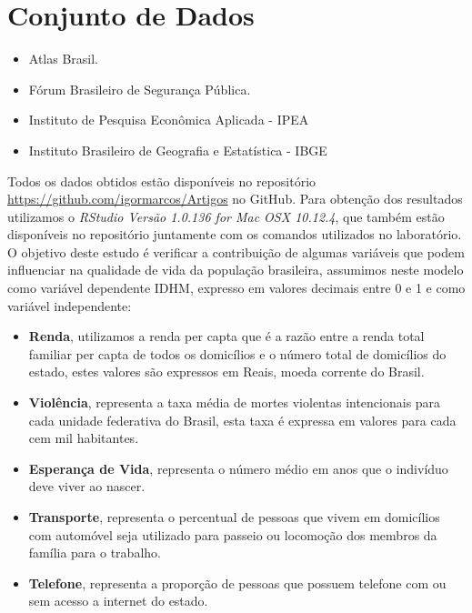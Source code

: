 \documentclass[10pt,foldmark,notumble]{leaflet}
\begin{document}
\pagebreak

\section{Conjunto de Dados}

\begin{itemize}
			\item Atlas Brasil.
            \item Fórum Brasileiro de Segurança Pública.
            \item Instituto de Pesquisa Econômica Aplicada - IPEA
            \item Instituto Brasileiro de Geografia e Estatística - IBGE
		\end{itemize} 
        

Todos os dados obtidos estão disponíveis no repositório \url{https://github.com/igormarcos/Artigos} no GitHub. Para obtenção dos resultados utilizamos o \emph{RStudio Versão 1.0.136 for Mac OSX 10.12.4}, que também estão disponíveis no repositório\cite{RepoIgor2017} juntamente com os comandos utilizados no laboratório. O objetivo deste estudo é verificar a contribuição de algumas variáveis que podem influenciar na qualidade de vida da população brasileira, assumimos neste modelo como variável dependente IDHM, expresso em valores decimais entre 0 e 1 e como variável independente:

\begin{itemize}
\item {\textbf{Renda}, utilizamos a renda per capta que é a razão entre a renda total familiar per capta de todos os domicílios e o número total de domicílios do estado, estes valores são expressos em Reais, moeda corrente do Brasil.}
\item {\textbf{Violência}, representa a taxa média de mortes violentas intencionais para cada unidade federativa do Brasil, esta taxa é expressa em valores para cada cem mil habitantes.}
\item {\textbf{Esperança de Vida}, representa o número médio em anos que o indivíduo deve viver ao nascer.}
\item {\textbf{Transporte}, representa o percentual de pessoas que vivem em domicílios com automóvel seja utilizado para passeio ou locomoção dos membros da família para o trabalho.}
\item {\textbf{Telefone}, representa a proporção de pessoas que possuem telefone com ou sem acesso a internet do estado.}
\end{itemize}
\end{document}

